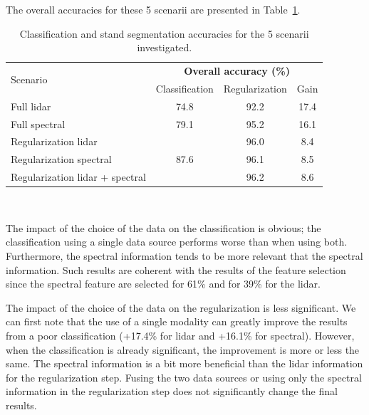 The overall accuracies for these 5 scenarii are presented in Table~\ref{table:fusion_results}.

\begin{table}[htbp]
\begin{center}
\begin{footnotesize}
\begin{tabular}{|l|c|c|c|}
\hline
\multirow{2}{*}{Scenario} & \multicolumn{3}{c|}{\textbf{Overall accuracy (\%)}} \\
\cline{2-4}
& Classification & Regularization & Gain \\
\hline
Full lidar & 74.8 & 92.2 & 17.4 \\
\hline
Full spectral & 79.1 & 95.2 & 16.1 \\
\hline
Regularization lidar & \multirow{3}{*}{87.6} & 96.0 & 8.4 \\
\cline{1-1} \cline{3-4}
Regularization spectral &  & 96.1 & 8.5 \\
\cline{1-1} \cline{3-4}
Regularization lidar + spectral &  & 96.2 & 8.6 \\
\hline
\end{tabular} \\
\end{footnotesize}
\end{center}
\vspace*{-5mm}
\caption{Classification and stand segmentation accuracies for the 5 scenarii investigated.}
\label{table:fusion_results}
\end{table}

The impact of the choice of the data on the classification is obvious; the classification using a single data source performs worse than when using both. Furthermore, the spectral information tends to be more relevant that the spectral information. Such results are coherent with the results of the feature selection since the spectral feature are selected for 61\% and for 39\% for the lidar.

The impact of the choice of the data on the regularization is less significant. We can first note that the use of a single modality can greatly improve the results from a poor classification (+17.4\% for lidar and +16.1\% for spectral). However, when the classification is already significant, the improvement is more or less the same. The spectral information is a bit more beneficial than the lidar information for the regularization step. Fusing the two data sources or using only the spectral information in the regularization step does not significantly change the final results.

